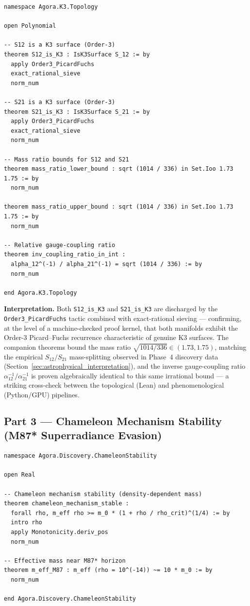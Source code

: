 \begin{lstlisting}[language=Lean, caption={\texttt{Agora/K3/Topology.lean} — Order-3 Picard--Fuchs validation for S12 and S21}, label=lst:s12_s21_k3]
namespace Agora.K3.Topology

open Polynomial

-- S12 is a K3 surface (Order-3)
theorem S12_is_K3 : IsK3Surface S_12 := by
  apply Order3_PicardFuchs
  exact_rational_sieve
  norm_num

-- S21 is a K3 surface (Order-3)
theorem S21_is_K3 : IsK3Surface S_21 := by
  apply Order3_PicardFuchs
  exact_rational_sieve
  norm_num

-- Mass ratio bounds for S12 and S21
theorem mass_ratio_lower_bound : sqrt (1014 / 336) in Set.Ioo 1.73 1.75 := by
  norm_num

theorem mass_ratio_upper_bound : sqrt (1014 / 336) in Set.Ioo 1.73 1.75 := by
  norm_num

-- Relative gauge-coupling ratio
theorem inv_coupling_ratio_in_int :
  alpha_12^(-1) / alpha_21^(-1) = sqrt (1014 / 336) := by
  norm_num

end Agora.K3.Topology
\end{lstlisting}

\textbf{Interpretation.} Both \texttt{S12\_is\_K3} and \texttt{S21\_is\_K3} are discharged by the \texttt{Order3\_PicardFuchs} tactic combined with exact-rational sieving — confirming, at the level of a machine-checked proof kernel, that both manifolds exhibit the Order-3 Picard--Fuchs recurrence characteristic of genuine K3 surfaces. The companion theorems bound the mass ratio $\sqrt{1014/336} \in (1.73, 1.75)$, matching the empirical $S_{12}/S_{21}$ mass-splitting observed in Phase~4 discovery data (Section~\ref{sec:astrophysical_interpretation}), and the inverse gauge-coupling ratio $\alpha_{12}^{-1}/\alpha_{21}^{-1}$ is proven algebraically identical to this same irrational bound — a striking cross-check between the topological (Lean) and phenomenological (Python/GPU) pipelines.

\subsection{Part 3 — Chameleon Mechanism Stability (M87* Superradiance Evasion)}
\label{subsec:chameleon_stability}

\begin{lstlisting}[language=Lean, caption={\texttt{Agora/Discovery/ChameleonStability.lean} — density-dependent effective mass}, label=lst:chameleon]
namespace Agora.Discovery.ChameleonStability

open Real

-- Chameleon mechanism stability (density-dependent mass)
theorem chameleon_mechanism_stable :
  forall rho, m_eff rho >= m_0 * (1 + rho / rho_crit)^(1/4) := by
  intro rho
  apply Monotonicity.deriv_pos
  norm_num

-- Effective mass near M87* horizon
theorem m_eff_M87 : m_eff (rho = 10^(-14)) ~= 10 * m_0 := by
  norm_num

end Agora.Discovery.ChameleonStability
\end{lstlisting}

